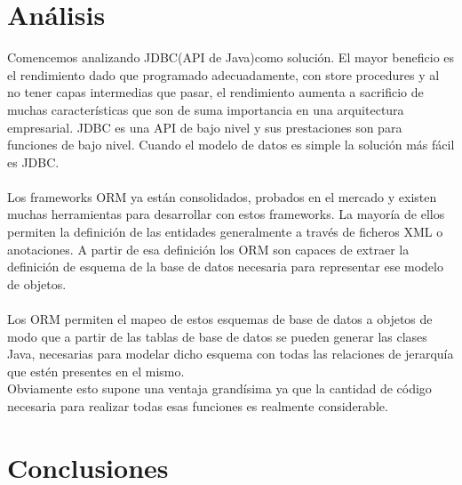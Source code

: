\documentclass[twoside,twocolumn]{article}
\begin{document}
\begin{flushright}
\begin{itemize}
\section{Análisis}
Comencemos analizando JDBC(API de Java)como solución. El mayor beneficio es el rendimiento dado que programado adecuadamente, con store procedures y al no tener capas intermedias que pasar, el rendimiento aumenta a sacrificio de muchas características que son de suma importancia en una arquitectura empresarial. JDBC es una API de bajo nivel y sus prestaciones son para funciones de bajo nivel.
Cuando el modelo de datos es simple la solución más fácil es JDBC.\textbf{}\\
\textbf{}\\
Los frameworks ORM ya están consolidados, probados en el mercado y existen muchas herramientas para desarrollar con estos frameworks. La mayoría de ellos permiten la definición de las entidades generalmente a través de ficheros XML o anotaciones. A partir de esa definición los ORM son capaces de extraer la definición de esquema de la base de datos necesaria para representar ese modelo de objetos. \textbf{}\\
\textbf{}\\
Los ORM permiten el mapeo de estos esquemas de base de datos a objetos de modo que a partir de las tablas de base de datos se pueden generar las clases Java, necesarias para modelar dicho esquema con todas las relaciones de jerarquía que estén presentes en el mismo.\textbf{}\\

Obviamente esto supone una ventaja grandísima ya que la cantidad de código necesaria para realizar todas esas funciones es realmente considerable.


\section{Conclusiones}


\end{itemize}
\end{flushright}
\end{document}
